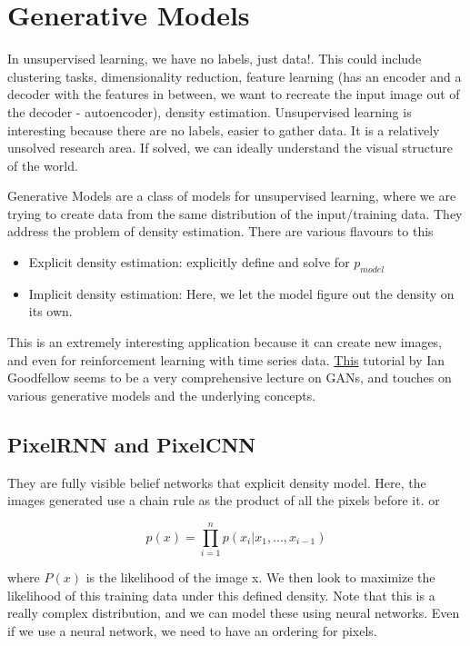 \chapter{Generative Models}

In unsupervised learning, we have no labels, just data!. This could include clustering tasks, dimensionality reduction, feature learning (has an encoder and a decoder with the features in between, we want to recreate the input image out of the decoder - autoencoder), density estimation. Unsupervised learning is interesting because there are no labels, easier to gather data. It is a relatively unsolved research area. If solved, we can ideally understand the visual structure of the world. 

Generative Models are a class of models for unsupervised learning, where we are trying to create data from the same distribution of the input/training data. They address the problem of density estimation. There are various flavours to this

\begin{itemize}
    \item Explicit density estimation: explicitly define and solve for $p_{model}$
    \item Implicit density estimation: Here, we let the model figure out the density on its own.
\end{itemize}

This is an extremely interesting application because it can create new images, and even for reinforcement learning with time series data. \href{https://arxiv.org/pdf/1701.00160.pdf}{This} tutorial by Ian Goodfellow seems to be a very comprehensive lecture on GANs, and touches on various generative models and the underlying concepts.

\section{PixelRNN and PixelCNN}

They are fully visible belief networks that explicit density model. Here, the images generated use a chain rule as the product of all the pixels before it. or

\begin{equation}
    p(x) = \prod_{i=1}^np(x_i|x_1, \hdots, x_{i-1})
\end{equation}

where $P(x)$ is the likelihood of the image x. We then look to maximize the likelihood of this training data under this defined density. Note that this is a really complex distribution, and we can model these using neural networks. Even if we use a neural network, we need to have an ordering for pixels. 

